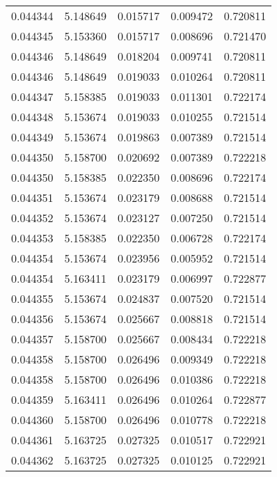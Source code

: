 \begin{tabular}{lrrrr}
0.044344    &  5.148649 &  0.015717 &  0.009472 &             0.720811 \\
0.044345    &  5.153360 &  0.015717 &  0.008696 &             0.721470 \\
0.044346    &  5.148649 &  0.018204 &  0.009741 &             0.720811 \\
0.044346    &  5.148649 &  0.019033 &  0.010264 &             0.720811 \\
0.044347    &  5.158385 &  0.019033 &  0.011301 &             0.722174 \\
0.044348    &  5.153674 &  0.019033 &  0.010255 &             0.721514 \\
0.044349    &  5.153674 &  0.019863 &  0.007389 &             0.721514 \\
0.044350    &  5.158700 &  0.020692 &  0.007389 &             0.722218 \\
0.044350    &  5.158385 &  0.022350 &  0.008696 &             0.722174 \\
0.044351    &  5.153674 &  0.023179 &  0.008688 &             0.721514 \\
0.044352    &  5.153674 &  0.023127 &  0.007250 &             0.721514 \\
0.044353    &  5.158385 &  0.022350 &  0.006728 &             0.722174 \\
0.044354    &  5.153674 &  0.023956 &  0.005952 &             0.721514 \\
0.044354    &  5.163411 &  0.023179 &  0.006997 &             0.722877 \\
0.044355    &  5.153674 &  0.024837 &  0.007520 &             0.721514 \\
0.044356    &  5.153674 &  0.025667 &  0.008818 &             0.721514 \\
0.044357    &  5.158700 &  0.025667 &  0.008434 &             0.722218 \\
0.044358    &  5.158700 &  0.026496 &  0.009349 &             0.722218 \\
0.044358    &  5.158700 &  0.026496 &  0.010386 &             0.722218 \\
0.044359    &  5.163411 &  0.026496 &  0.010264 &             0.722877 \\
0.044360    &  5.158700 &  0.026496 &  0.010778 &             0.722218 \\
0.044361    &  5.163725 &  0.027325 &  0.010517 &             0.722921 \\
0.044362    &  5.163725 &  0.027325 &  0.010125 &             0.722921 \\

\end{tabular}
